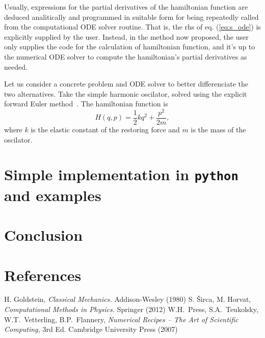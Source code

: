 \documentclass{iopart}
\newcommand{\hmatrix}{\ensuremath{%
  \begin{pmatrix}
    \mathbbm{O}&\mathbbm{I}\\-\mathbbm{I}&\mathbbm{O}
  \end{pmatrix}
}}
\begin{document}
Usually, expressions for the partial derivatives of the hamiltonian function are
deduced analitically and programmed in suitable form for being repeatedly called
from the computational ODE solver routine. That is, the rhs of eq.
(\ref{eq:s_ode}) is explicitly supplied by the user. Instead, in the method now
proposed, the user only supplies the code for the calculation of hamiltonian
function, and it's up to the numerical ODE solver to compute the hamiltonian's
partial derivatives as needed.

Let us consider a concrete problem and ODE solver to better differenciate the
two alternatives. Take the simple harmonic oscilator, solved using the explicit
forward Euler method~\cite{sir:2010}. The hamiltonian function is
\begin{equation}
  H(q,p) = \frac{1}{2}kq^2+\frac{p^2}{2m},
\end{equation}
where $k$ is the elastic constant of the restoring force and $m$ is the mass of
the oscilator.


\section{Simple implementation in \texttt{python} and examples}
\section{Conclusion}

\section*{References}
\begin{thebibliography}{99}
   H. Goldstein, \textsl{Classical Mechanics.} Addison-Wesley
  (1980)
   S. \v{S}irca, M. Horvat, \textsl{Computational Methods in
  Physics.} Springer (2012)
   W.H.~Press, S.A.~Teukolsky, W.T.~Vetterling, B.P.~Flannery,
  \textsl{Numerical Recipes -- The Art of Scientific Computing,} 3rd Ed.
  Cambridge University Press (2007)
\end{thebibliography}
\end{document}
